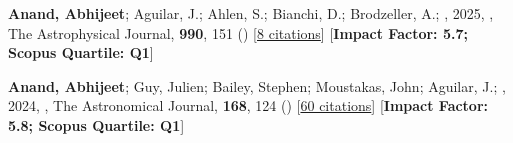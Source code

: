 \item[{\color{numcolor}\scriptsize2}] \textbf{Anand, Abhijeet}; Aguilar, J.; Ahlen, S.; Bianchi, D.; Brodzeller, A.; \etal, 2025, , The Astrophysical Journal, \textbf{990}, 151 () [\href{https://ui.adsabs.harvard.edu/abs/2025ApJ...990..151A}{8 citations}] [\textbf{Impact Factor: 5.7; Scopus Quartile: Q1}]

\item[{\color{numcolor}\scriptsize1}] \textbf{Anand, Abhijeet}; Guy, Julien; Bailey, Stephen; Moustakas, John; Aguilar, J.; \etal, 2024, , The Astronomical Journal, \textbf{168}, 124 () [\href{https://ui.adsabs.harvard.edu/abs/2024AJ....168..124A}{60 citations}] [\textbf{Impact Factor: 5.8; Scopus Quartile: Q1}]